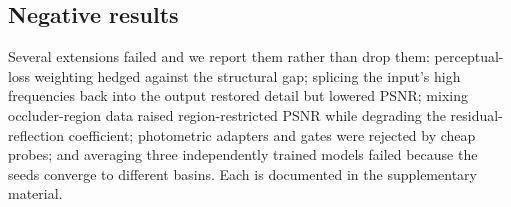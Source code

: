 \subsection{Negative results}
\label{sec:negative}
Several extensions failed and we report them rather than drop them:
perceptual-loss weighting hedged against the structural gap; splicing the
input's high frequencies back into the output restored detail but lowered PSNR;
mixing occluder-region data raised region-restricted PSNR while degrading the
residual-reflection coefficient; photometric adapters and gates were rejected
by cheap probes; and averaging three independently trained models failed
because the seeds converge to different basins. Each is documented in the
supplementary material.
